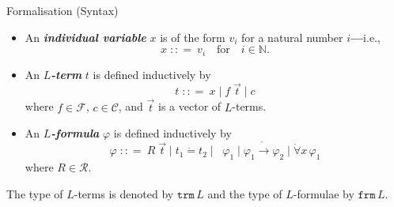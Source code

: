 \documentclass[serif,table,10pt]{beamer}
\newcommand{\IN}{\mathbb{N}}
\newcommand{\0}{\texttt{0}}
\newcommand{\1}{\texttt{1}}
\newcommand{\inlinedef}[1]{\emph{\textbf{#1}}}
\newcommand{\bnfis}{\mathrel{\;{:}{:}{=}\ }}
\newcommand{\bnfor}{\mathrel{\;\big|\; }}
\newcommand{\Leq}{\mathrel{\dot{=}}}
\newcommand{\Lneg}{\mathop{\dot{\neg}}}
\newcommand{\Lto}{\mathrel{\dot{\to}}}
\newcommand{\Lall}[1]{\dot{\forall}#1\,}
\begin{document}
\begin{frame}{Formalisation (Syntax)}

    \begin{itemize}
        \item An \inlinedef{individual variable} $x$ is of the form $v_i$ for a natural number $i$\textbf{---}i.e., \[ x \bnfis v_i \quad \mathrm{for} \quad i \in \IN . \]
        \item An \inlinedef{$L$-term} $t$ is defined inductively by \[t \bnfis x \bnfor f \; \vec{t} \bnfor c\] where $f \in \mathcal{F}$, $c \in \mathcal{C}$, and $\vec{t}$ is a vector of $L$-terms.
        \item An \inlinedef{$L$-formula} $\varphi$ is defined inductively by \[\varphi \bnfis R \; \vec{t} \bnfor t_1 \Leq t_2 \bnfor \Lneg \varphi_1 \bnfor  \varphi_1  \Lto \varphi_2 \bnfor \Lall{x} \varphi_1\] where $R \in \mathcal{R}$.
    \end{itemize}

    The type of $L$-terms is denoted by $ \mathtt{trm} \, L $ and the type of $L$-formulae by $ \mathtt{frm} \, L $.

\end{frame}
\end{document}
